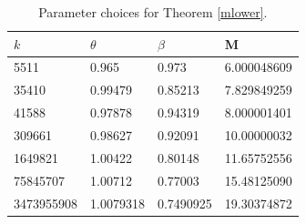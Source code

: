 \begin{table}
\centering
 \caption{Parameter choices for Theorem \ref{mlower}.}
 \label{narrow-table}
  \begin{tabular}{llll}
   \toprule
     $k$    & $\theta$   & $\beta$          &M \\
   \midrule
           5511 & 0.965              & 0.973               & 6.000048609 \\ 
          35410 & 0.99479            & 0.85213             & 7.829849259 \\ [0.5ex]
          41588 & 0.97878  	         & 0.94319             & 8.000001401 \\
         309661 & 0.98627            & 0.92091             & 10.00000032 \\ [0.5ex]
				1649821 & 1.00422            & 0.80148             & 11.65752556 \\  
       75845707 & 1.00712            & 0.77003             & 15.48125090 \\  [0.5ex]
     3473955908 & 1.0079318          & 0.7490925           & 19.30374872 \\  
   \bottomrule
  \end{tabular}
\end{table}
